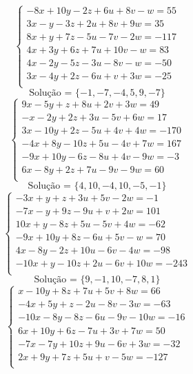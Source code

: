 \documentclass[12pt,oneside,a4paper]{article}
\begin{document}
\vspace{\baselineskip}
\begin{equation*}
\begin{cases}
-8x+10y-2z+6u+8v-w=55 \\
3x-y-3z+2u+8v+9w=35 \\
8x+y+7z-5u-7v-2w=-117 \\
4x+3y+6z+7u+10v-w=83 \\
4x-2y-5z-3u-8v-w=-50 \\
3x-4y+2z-6u+v+3w=-25 \\
\end{cases}
\end{equation*}
\begin{equation*}
\text{Solução = }\{-1,-7,-4,5,9,-7\}
\end{equation*}
\vspace{\baselineskip}
\begin{equation*}
\begin{cases}
9x-5y+z+8u+2v+3w=49 \\
-x-2y+2z+3u-5v+6w=17 \\
3x-10y+2z-5u+4v+4w=-170 \\
-4x+8y-10z+5u-4v+7w=167 \\
-9x+10y-6z-8u+4v-9w=-3 \\
6x-8y+2z+7u-9v-9w=60 \\
\end{cases}
\end{equation*}
\begin{equation*}
\text{Solução = }\{4,10,-4,10,-5,-1\}
\end{equation*}
\vspace{\baselineskip}
\begin{equation*}
\begin{cases}
-3x+y+z+3u+5v-2w=-1 \\
-7x-y+9z-9u+v+2w=101 \\
10x+y-8z+5u-5v+4w=-62 \\
-9x+10y+8z-6u+5v-w=70 \\
4x-8y-2z+10u-6v-4w=-98 \\
-10x+y-10z+2u-6v+10w=-243 \\
\end{cases}
\end{equation*}
\begin{equation*}
\text{Solução = }\{9,-1,10,-7,8,1\}
\end{equation*}
\vspace{\baselineskip}
\begin{equation*}
\begin{cases}
x-10y+8z+7u+5v+8w=66 \\
-4x+5y+z-2u-8v-3w=-63 \\
-10x-8y-8z-6u-9v-10w=-16 \\
6x+10y+6z-7u+3v+7w=50 \\
-7x-7y+10z+9u-6v+3w=-32 \\
2x+9y+7z+5u+v-5w=-127 \\
\end{cases}
\end{equation*}
\end{document}
